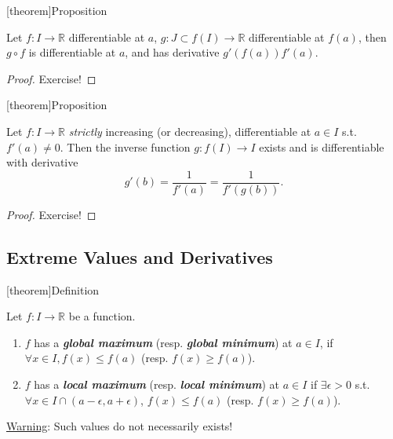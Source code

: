 \documentclass[12pt]{report}
\theoremstyle{definition}
\begin{document}
[theorem]{Proposition}
\begin{chain rule}
    Let $f:I\rightarrow{}\mathbb{R}$ differentiable at $a$, 
    $g:J\subset f(I) \rightarrow{}\mathbb{R}$ differentiable at $f(a)$,
    then $g\circ f$ is differentiable at $a$, and has derivative $g'(f(a))f'(a)$.
\end{chain rule}

\begin{proof}
    Exercise!
\end{proof}

[theorem]{Proposition}
\begin{inverse function differentiation}
    Let $f:I\rightarrow{}\mathbb{R}$ \emph{strictly} increasing (or decreasing),
    differentiable at $a\in I$ s.t. $f'(a) \neq 0$.
    Then the inverse function $g:f(I)\rightarrow{}I$ exists and is differentiable with derivative\[
        g'(b) = \frac{1}{f'(a)} = \frac{1}{f'(g(b))}.
    \]
\end{inverse function differentiation}

\begin{proof}
    Exercise!
\end{proof}

\subsection{Extreme Values and Derivatives}

[theorem]{Definition}
\begin{global/local maximum/minimum}
    Let $f:I\rightarrow{}\mathbb{R}$ be a function.
    \begin{enumerate}[label = (\arabic*)]
        \item $f$ has a \textbf{\emph{global maximum}} (resp. \textbf{\emph{global minimum}})
            at $a\in I$, if $\forall x \in I, f(x) \le f(a)$ (resp. $f(x) \ge f(a)$).
        \item $f$ has a \textbf{\emph{local maximum}} (resp. \textbf{\emph{local minimum}})
            at $a\in I$ if $\exists \epsilon > 0$ s.t. $\forall x \in I \cap (a-\epsilon, a+\epsilon)$,
            $f(x) \le f(a)$ (resp. $f(x) \ge f(a)$).
    \end{enumerate}
\end{global/local maximum/minimum}

\underline{Warning}: Such values do not necessarily exists!
\end{document}
